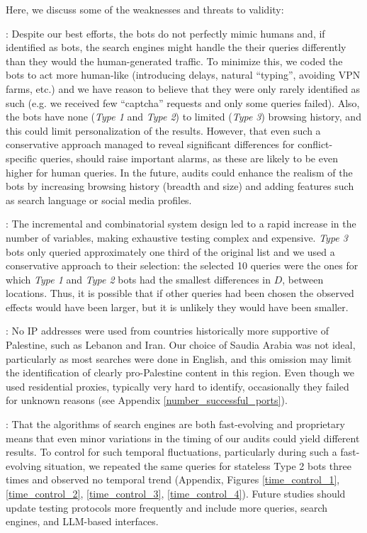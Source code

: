 Here, we discuss some of the weaknesses and threats to validity: %

: Despite our best efforts, the bots do not perfectly mimic humans and, if identified as bots, the search engines might handle the their queries differently than they would the human-generated traffic. To minimize this, we coded the bots to act more human-like (introducing delays, natural ``typing'', avoiding VPN farms, etc.) and we have reason to believe that they were only rarely identified as such (e.g. we received few ``captcha'' requests and only some queries failed). Also, the bots have none (\textit{Type 1} and \textit{Type 2}) to limited (\textit{Type 3}) browsing history, and this could limit personalization of the results.  However, that even such a conservative approach managed to reveal significant differences for conflict-specific queries, should raise important alarms, as these are likely to be even higher for human queries. In the future, audits could enhance the realism of the bots by increasing browsing history (breadth and size) and adding features such as search language or social media profiles.
    
: The incremental and combinatorial system design led to a rapid increase in the number of variables, making exhaustive testing complex and expensive. \textit{Type 3} bots only queried approximately one third of the original list and we used a conservative approach to their selection: the selected 10 queries were the ones for which \textit{Type 1} and \textit{Type 2} bots had the smallest differences in $D$, between locations. Thus, it is possible that if other queries had been chosen the observed effects would have been larger, but it is unlikely they would have been smaller.

: No IP addresses were used from countries historically more supportive of Palestine, such as Lebanon and Iran. Our choice of Saudia Arabia was not ideal, particularly as most searches were done in English, and this omission may limit the identification of clearly pro-Palestine content in this region. Even though we used residential proxies, typically very hard to identify, occasionally they failed for unknown reasons (see Appendix \ref{number_successful_ports}). 
    
: That the algorithms of search engines are both fast-evolving and proprietary means that even minor variations in the timing of our audits could yield different results. To control for such temporal fluctuations, particularly during such a fast-evolving situation, we repeated the same queries for stateless Type 2 bots three times and observed no temporal trend (Appendix, Figures \ref{time_control_1}, \ref{time_control_2}, \ref{time_control_3}, \ref{time_control_4}). Future studies should update testing protocols more frequently and include more queries, search engines, and LLM-based interfaces.
 
